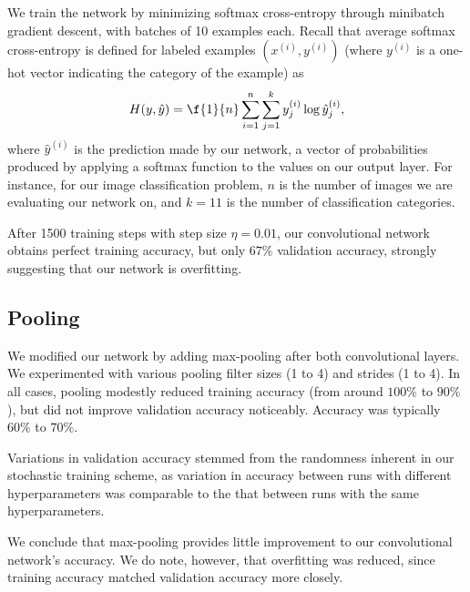 \documentclass{article}
\newcommand{\sind}[1]{^{(#1)}}
\begin{document}
\begin{multicols}{2}
We train the network by minimizing softmax cross-entropy
through minibatch gradient descent,
with batches of 10 examples each.
Recall that average softmax cross-entropy is defined
for labeled examples $(x\sind{i}, y\sind{i})$
(where $y\sind{i}$ is a one-hot vector indicating the category of the example)
as
\begin{equation}
    H(y, \hat y) = \f{1}{n}\sum_{i=1}^n
                             \sum_{j=1}^k
                               y\sind{i}_j \log \hat y\sind{i}_j,
\end{equation}
where $\hat y\sind{i}$ is the prediction made by our network,
a vector of probabilities
produced by applying a softmax function
to the values on our output layer.
For instance, for our image classification problem,
$n$ is the number of images we are evaluating our network on,
and $k=11$ is the number of classification categories.

After 1500 training steps with step size $\eta = 0.01$,
our convolutional network obtains perfect training accuracy,
but only $67\%$ validation accuracy,
strongly suggesting that our network is overfitting.

\subsection{Pooling}

We modified our network by adding max-pooling
after both convolutional layers.
We experimented with various pooling filter sizes (1 to 4)
and strides (1 to 4).
In all cases,
pooling modestly reduced training accuracy
(from around $100\%$ to $90\%$),
but did not improve validation accuracy noticeably.
Accuracy was typically $60\%$ to $70\%$.

Variations in validation accuracy
stemmed from the randomness inherent in our stochastic training scheme,
as variation in accuracy between runs with different hyperparameters
was comparable to the that between runs with the same hyperparameters.

We conclude that max-pooling provides little improvement
to our convolutional network's accuracy.
We do note, however, that overfitting was reduced,
since training accuracy matched validation accuracy more closely.


\end{multicols}
\end{document}
